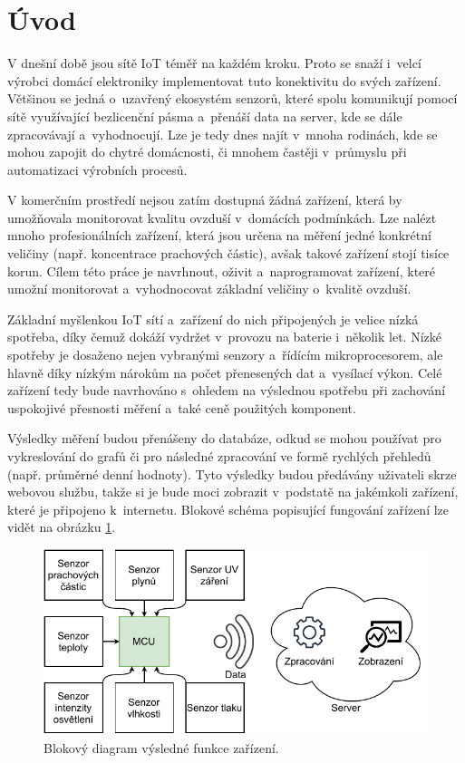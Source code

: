 \chapter*{Úvod}
{}

V dnešní době jsou sítě IoT téměř na každém kroku. Proto se snaží i~velcí výrobci domácí elektroniky implementovat tuto konektivitu do svých zařízení. Většinou se jedná o~uzavřený ekosystém senzorů, které spolu komunikují pomocí sítě využívající bezlicenční pásma a~přenáší data na server, kde se dále zpracovávají a~vyhodnocují. Lze je tedy dnes najít v~mnoha rodinách, kde se mohou zapojit do chytré domácnosti, či mnohem častěji v~průmyslu při automatizaci výrobních procesů.

V komerčním prostředí nejsou zatím dostupná žádná zařízení, která by umožňovala monitorovat kvalitu ovzduší v~domácích podmínkách. Lze nalézt mnoho profesionálních zařízení, která jsou určena na měření jedné konkrétní veličiny (např. koncentrace prachových částic), avšak takové zařízení stojí tisíce korun. Cílem této práce je navrhnout, oživit a~naprogramovat zařízení, které umožní monitorovat a~vyhodnocovat základní veličiny o~kvalitě ovzduší.

Základní myšlenkou IoT sítí a~zařízení do nich připojených je velice nízká spotřeba, díky čemuž dokáží vydržet v~provozu na baterie i~několik let. Nízké spotřeby je dosaženo nejen vybranými senzory a~řídícím mikroprocesorem, ale hlavně díky nízkým nárokům na počet přenesených dat a~vysílací výkon. Celé zařízení tedy bude navrhováno s~ohledem na výslednou spotřebu při zachování uspokojivé přesnosti měření a~také ceně použitých komponent.

Výsledky měření budou přenášeny do databáze, odkud se mohou používat pro vykreslování do grafů či pro následné zpracování ve formě rychlých přehledů (např. průměrné denní hodnoty). Tyto výsledky budou předávány uživateli skrze webovou službu, takže si je bude moci zobrazit v~podstatě na jakémkoli zařízení, které je připojeno k~internetu. Blokové schéma popisující fungování zařízení lze vidět na obrázku \ref{fig_BlockDiagram-blank}.

\begin{figure}[h]
    \centering
    \includegraphics{obrazky/block_schematic-blank.drawio.pdf}
    \caption{Blokový diagram výsledné funkce zařízení.}
    \label{fig_BlockDiagram-blank}
\end{figure}